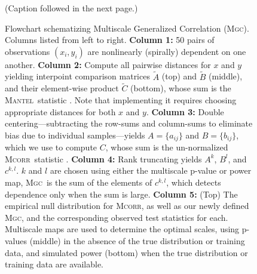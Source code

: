 \documentclass[11pt]{article}
\newcommand{\note}[2][]{\added[#1,remark={#2}]{}}
\providecommand{\sct}[1]{{\normalfont\textsc{#1}}}
\newcommand{\G}{c}
\newcommand{\Mgc}{\sct{Mgc}}
\newcommand{\Mcorr}{\sct{Mcorr}}
\newcommand{\Mantel}{\sct{Mantel}}
\newcommand{\jv}[1]{{\note{jv: #1}}}
\newcommand{\cs}[1]{{\note{cs: #1}}}
\begin{document}
\begin{figure}[htbp]
\begin{center}
\begin{tabular}{c  c  c  c}
\end{tabular}
\cs{can you color code this table? maybe just using two colors to denote positive and negative?
also, do we want another row, that shows the sum across the $\delta_x \times \delta_y$ values?}
\jv{tried above}
\cs{color each value for the top six rows, and change green to be darker. consider matlab outputting the whole table and using an include function.}
\jv{re-generate figure and table once you decide which one to use?}
\end{center}
\caption{(Caption followed in the next page.)}
\label{f:schematic}
\end{figure}


\addtocounter{figure}{-1}

\begin{figure}[htbp]
\caption{
Flowchart schematizing Multiscale Generalized Correlation (\Mgc). Columns listed from left to right.
\textbf{Column 1:} 50 pairs of observations $(x_i,y_i)$ are nonlinearly (spirally) dependent on one another.
% 
\textbf{Column 2:} Compute all pairwise distances for $x$ and $y$ yielding interpoint comparison matrices
 $\tilde{A}$ (top) and $\tilde{B}$ (middle), 
and their element-wise product $\tilde{C}$ (bottom), whose sum is the  \Mantel~statistic \cite{Mantel1967}.
Note that implementing it requires choosing appropriate distances for both $x$ and $y$.  
% 
\textbf{Column 3:} Double centering---subtracting the row-sums and column-sums to eliminate bias due to individual samples---yields $A=\{a_{ij}\}$ and $B=\{b_{ij}\}$, which we use to compute $C$, whose sum is the un-normalized \Mcorr~statistic \cite{SzekelyRizzo2013a}.
% 
\textbf{Column 4:} Rank truncating yields $A^{k}$, $B^{l}$, and $\G^{k,l}$.  $k$ and $l$ are chosen using either the multiscale p-value or power map, \Mgc~is the sum of the elements of $\G^{k,l}$, which detects dependence only when the sum is large.
\textbf{Column 5:} (Top) The empirical null distribution for \Mcorr, as well as our newly defined \Mgc, and the corresponding observed test statistics for each. 
Multiscale  maps are used to determine the optimal scales, using p-values (middle)  in the absence of the true distribution or training data, and simulated power (bottom) when the true distribution or training data are available.  
}
\end{figure}
\end{document}
